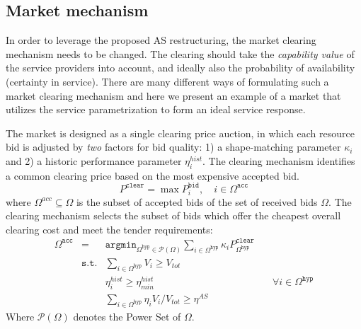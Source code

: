 \subsection{Market mechanism}\label{subsec:marketmechanism}

In order to leverage the proposed AS restructuring, the market clearing mechanism needs to be changed. The clearing should take the \emph{capability value} of the service providers into account, and ideally also the probability of availability (certainty in service). There are many different ways of formulating such a market clearing mechanism and here we present an example of a market that utilizes the service parametrization to form an ideal service response.

The market is designed as a single clearing price auction, in which each resource bid is adjusted by \textit{two} factors for bid quality: 1) a shape-matching parameter $\kappa_i$ and 2) a historic performance  parameter $\eta^{hist}_i$.
The clearing mechanism identifies a common clearing price based on the most expensive accepted bid. 
\begin{equation}
    P^\mathtt{clear} = \max P^\mathtt{bid}_i, \quad i \in \Omega^\mathtt{acc}
\end{equation}
where $\Omega^{acc}\subseteq \Omega$ is the subset of accepted bids of the set of received bids $\Omega$. 
The clearing mechanism selects the subset of bids which offer the cheapest overall clearing cost and meet the tender requirements: 
\begin{align}
      \Omega^\mathtt{acc} &= &\mathtt{argmin}_{\Omega^\mathtt{hyp} \in \mathcal P(\Omega)} \sum_{i\in \Omega^\mathtt{hyp}}{\kappa_i P^\mathtt{clear}_{\Omega^\mathtt{hyp}} } & \\
      &\mathtt{s.t.}& \sum_{i\in \Omega^\mathtt{hyp}} V_{i}\ge V_{tot} &  \\
      &~ & \eta^{hist}_i \geq \eta^{hist}_{min} &\quad \forall i \in \Omega^\mathtt{hyp} \\
      &~ &\sum_{i\in \Omega^\mathtt{hyp}}{\eta_i V_i}/V_{tot} \geq \eta^{AS}& 
\end{align}
Where $\mathcal P(\Omega)$ denotes the Power Set of $\Omega$.

